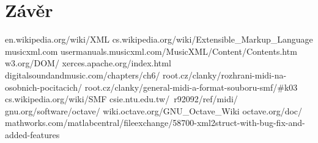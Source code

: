 \documentclass[12pt,a4paper,titlepage]{article}
\begin{document}
\section{Závěr}
\newpage
{}
\begin{thebibliography}{20}
en.wikipedia.org/wiki/XML
cs.wikipedia.org/wiki/Extensible\_Markup\_Language
musicxml.com
usermanuals.musicxml.com/MusicXML/Content/Contents.htm
w3.org/DOM/
xerces.apache.org/index.html
digitalsoundandmusic.com/chapters/ch6/
root.cz/clanky/rozhrani-midi-na-osobnich-pocitacich/
root.cz/clanky/general-midi-a-format-souboru-smf/\#k03
cs.wikipedia.org/wiki/SMF
csie.ntu.edu.tw/~r92092/ref/midi/
gnu.org/software/octave/
wiki.octave.org/GNU\_Octave\_Wiki
octave.org/doc/
mathworks.com/matlabcentral/fileexchange/58700-xml2struct-with-bug-fix-and-added-features
\end{thebibliography}
\end{document}
